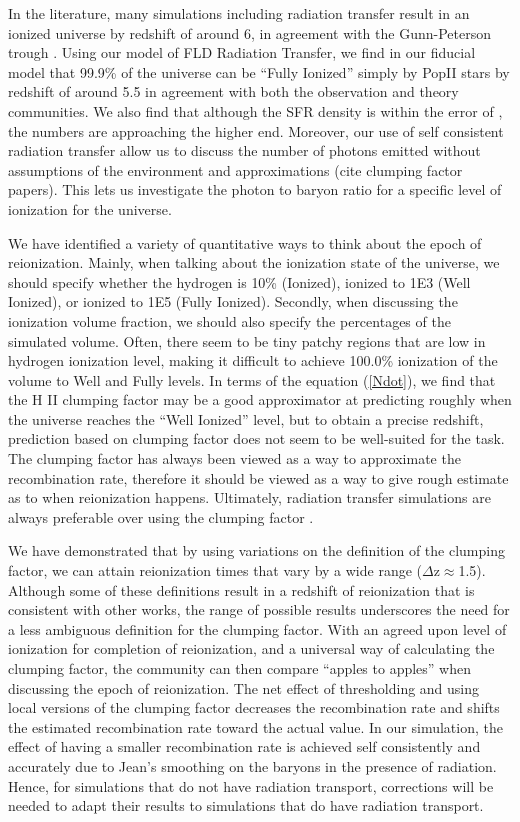 \documentclass[letterpaper,10pt]{article}
\renewcommand{\(}{\left(}
\renewcommand{\)}{\right)}
\begin{document}
In the literature, many simulations including radiation transfer
result in an ionized universe by redshift of around 6, in agreement
with the Gunn-Peterson trough \citep{TracCen2007}.  Using our model of FLD
Radiation Transfer, we find in our fiducial model that 99.9\% of the
universe can be ``Fully Ionized'' simply by PopII stars by redshift of
around 5.5 in agreement with both the observation and theory
communities.  We also find that although the SFR density is within the
error of \cite{Bouwensetal2011}, the numbers are approaching the
higher end.  Moreover, our use of self consistent radiation transfer
allow us to discuss the number of photons emitted without assumptions
of the environment and approximations (cite clumping factor papers).
This lets us investigate the photon to baryon ratio for a specific
level of ionization for the universe. 

We have identified a variety of quantitative ways to think about the
epoch of reionization.  Mainly, when talking about the ionization
state of the universe, we should specify whether the hydrogen is 10\%
(Ionized), ionized to 1E3 (Well Ionized), or ionized to 1E5 (Fully
Ionized).  Secondly, when discussing the ionization volume fraction,
we should also specify the percentages of the simulated volume.
Often, there seem to be tiny patchy regions that are low in hydrogen
ionization level, making it difficult to achieve 100.0\% ionization of
the volume to Well and Fully levels.  In terms of the equation (\ref{Ndot}), we find that the H
{\footnotesize II} clumping factor may be a good approximator at
predicting roughly when the universe reaches the ``Well Ionized''
level, but to obtain a precise redshift, prediction based on clumping
factor does not seem to be well-suited for the task.  The clumping
factor has always been viewed as a way to approximate the
recombination rate, therefore it should be viewed as a way to give 
rough estimate as to when reionization happens.  Ultimately, 
radiation transfer simulations are always preferable over using the 
clumping factor \citep{RaicevicTheuns2011}.

We have demonstrated that by using variations on the definition of the
clumping factor, we can attain reionization times that vary by a wide
range ($\Delta$z$\approx$1.5).  Although some of these definitions
result in a redshift of reionization that is consistent with other
works, the range of possible results underscores the need for a less
ambiguous definition for the clumping factor.  With an agreed upon
level of ionization for completion of reionization, and a universal
way of calculating the clumping factor, the community can then compare
``apples to apples'' when discussing the epoch of reionization.   
The net effect of thresholding and using local versions of the
clumping factor decreases the recombination rate and 
shifts the estimated recombination rate toward the actual value.  
In our simulation, the effect of having a smaller recombination rate is 
achieved self consistently and accurately due to Jean's smoothing on 
the baryons in the presence of radiation.  Hence, for simulations that
do not have radiation transport, corrections will be needed to adapt their
results to simulations that do have radiation transport.  
\end{document}

